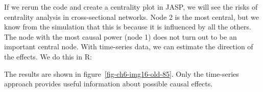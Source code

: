 \documentclass[
  a4paper,
  DIV=11,
  numbers=noendperiod,
  oneside]{scrreprt}
\newenvironment{Shaded}{}{}
\newcommand{\AttributeTok}[1]{\textcolor[rgb]{0.84,0.23,0.29}{#1}}
\newcommand{\CommentTok}[1]{\textcolor[rgb]{0.42,0.45,0.49}{#1}}
\newcommand{\ConstantTok}[1]{\textcolor[rgb]{0.00,0.36,0.77}{#1}}
\newcommand{\DecValTok}[1]{\textcolor[rgb]{0.00,0.36,0.77}{#1}}
\newcommand{\FunctionTok}[1]{\textcolor[rgb]{0.44,0.26,0.76}{#1}}
\newcommand{\NormalTok}[1]{\textcolor[rgb]{0.14,0.16,0.18}{#1}}
\newcommand{\OtherTok}[1]{\textcolor[rgb]{0.44,0.26,0.76}{#1}}
\newcommand{\SpecialCharTok}[1]{\textcolor[rgb]{0.00,0.36,0.77}{#1}}
\newcommand{\StringTok}[1]{\textcolor[rgb]{0.01,0.18,0.38}{#1}}
\begin{document}
If we rerun the code and create a centrality plot in JASP, we will see
the risks of centrality analysis in cross-sectional networks. Node 2 is
the most central, but we know from the simulation that this is because
it is influenced by all the others. The node with the most causal power
(node 1) does not turn out to be an important central node. With
time-series data, we can estimate the direction of the effects. We do
this in R:

\begin{Shaded}
\end{Shaded}

The results are shown in figure~\ref{fig-ch6-img16-old-85}. Only the
time-series approach provides useful information about possible causal
effects.
\end{document}
